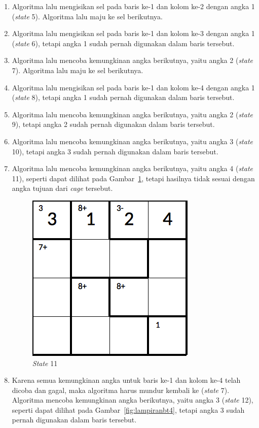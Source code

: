 \begin{enumerate}
\item Algoritma lalu mengisikan sel pada baris ke-1 dan kolom ke-2 dengan angka 1 (\textit{state} 5). Algoritma lalu maju ke sel berikutnya.
\item Algoritma lalu mengisikan sel pada baris ke-1 dan kolom ke-3 dengan angka 1 (\textit{state} 6), tetapi angka 1 sudah pernah digunakan dalam baris tersebut.
\item Algoritma lalu mencoba kemungkinan angka berikutnya, yaitu angka 2 (\textit{state} 7). Algoritma lalu maju ke sel berikutnya.
\item Algoritma lalu mengisikan sel pada baris ke-1 dan kolom ke-4 dengan angka 1 (\textit{state} 8), tetapi angka 1 sudah pernah digunakan dalam baris tersebut.
\item Algoritma lalu mencoba kemungkinan angka berikutnya, yaitu angka 2 (\textit{state} 9), tetapi angka 2 sudah pernah digunakan dalam baris tersebut.
\item Algoritma lalu mencoba kemungkinan angka berikutnya, yaitu angka 3 (\textit{state} 10), tetapi angka 3 sudah pernah digunakan dalam baris tersebut.
\item Algoritma lalu mencoba kemungkinan angka berikutnya, yaitu angka 4 (\textit{state} 11), seperti dapat dilihat pada Gambar~\ref{fig:lampiranbt3}, tetapi hasilnya tidak sesuai dengan angka tujuan dari \textit{cage} tersebut.

\begin{figure}
\centering
\captionsetup{justification=centering}
\includegraphics[scale=0.333]{Gambar/backtracking/State11}
\caption[\textit{State} 11]{\textit{State} 11}
\label{fig:lampiranbt3}
\end{figure}

\item Karena semua kemungkinan angka untuk baris ke-1 dan kolom ke-4 telah dicoba dan gagal, maka algoritma harus mundur kembali ke (\textit{state} 7). Algoritma mencoba kemungkinan angka berikutnya, yaitu angka 3  (\textit{state} 12), seperti dapat dilihat pada Gambar~\ref{fig:lampiranbt4}, tetapi angka 3 sudah pernah digunakan dalam baris tersebut.


\end{enumerate}

